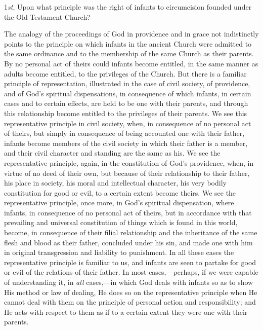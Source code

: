 \documentclass[english,]{book}
\begin{document}
1\emph{st}, Upon what principle was the right of infants to circumcision founded under the Old Testament Church?

The analogy of the proceedings of God in providence and in grace not indistinctly points to the principle on which infants in the ancient Church were admitted to the same ordinance and to the membership of the same Church as their parents. By no personal act of theirs could infants become entitled, in the same manner as adults become entitled, to the privileges of the Church. But there is a familiar principle of representation, illustrated in the case of civil society, of providence, and of God's spiritual dispensations, in consequence of which infants, in certain cases and to certain effects, are held to be one with their parents, and through this relationship become entitled to the privileges of their parents. We see this representative principle in civil society, when, in consequence of no personal act of theirs, but simply in consequence of being accounted one with their father, infants become members of the civil society in which their father is a member, and their civil character and standing are the same as his. We see the representative principle, again, in the constitution of God's providence, when, in virtue of no deed of their own, but because of their relationship to their father, his place in society, his moral and intellectual character, his very bodily constitution for good or evil, to a certain extent become theirs. We see the representative principle, once more, in God's spiritual dispensation, where infants, in consequence of no personal act of theirs, but in accordance with that prevailing and universal constitution of things which is found in this world, become, in consequence of their filial relationship and the inheritance of the same flesh and blood as their father, concluded under his sin, and made one with him in original transgression and liability to punishment. In all these cases the representative principle is familiar to us, and infants are seen to partake for good or evil of the relations of their father. In most cases,---perhaps, if we were capable of understanding it, in \emph{all} cases,---in which God deals with infants so as to show His method or law of dealing, He does so on the representative principle when He cannot deal with them on the principle of personal action and responsibility; and He acts with respect to them as if to a certain extent they were one with their parents.
\end{document}
